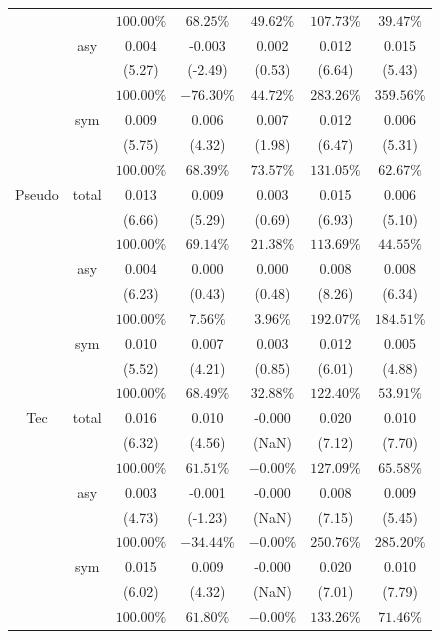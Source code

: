 \documentclass[
]{article}
\begin{document}
\begin{table}[H]
{\begin{tabular}{ccccccc}
   &  & $100.00\%$ & $68.25\%$ & $49.62\%$ & $107.73\%$ & $39.47\%$ \\ 
   & asy & 0.004 & -0.003 & 0.002 & 0.012 & 0.015 \\ 
   &  & (5.27) & (-2.49) & (0.53) & (6.64) & (5.43) \\ 
   &  & $100.00\%$ & $-76.30\%$ & $44.72\%$ & $283.26\%$ & $359.56\%$ \\ 
   & sym & 0.009 & 0.006 & 0.007 & 0.012 & 0.006 \\ 
   &  & (5.75) & (4.32) & (1.98) & (6.47) & (5.31) \\ 
   &  & $100.00\%$ & $68.39\%$ & $73.57\%$ & $131.05\%$ & $62.67\%$ \\ 
   \hline 
Pseudo & total & 0.013 & 0.009 & 0.003 & 0.015 & 0.006 \\ 
   &  & (6.66) & (5.29) & (0.69) & (6.93) & (5.10) \\ 
   &  & $100.00\%$ & $69.14\%$ & $21.38\%$ & $113.69\%$ & $44.55\%$ \\ 
   & asy & 0.004 & 0.000 & 0.000 & 0.008 & 0.008 \\ 
   &  & (6.23) & (0.43) & (0.48) & (8.26) & (6.34) \\ 
   &  & $100.00\%$ & $7.56\%$ & $3.96\%$ & $192.07\%$ & $184.51\%$ \\ 
   & sym & 0.010 & 0.007 & 0.003 & 0.012 & 0.005 \\ 
   &  & (5.52) & (4.21) & (0.85) & (6.01) & (4.88) \\ 
   &  & $100.00\%$ & $68.49\%$ & $32.88\%$ & $122.40\%$ & $53.91\%$ \\ 
   \hline 
Tec & total & 0.016 & 0.010 & -0.000 & 0.020 & 0.010 \\ 
   &  & (6.32) & (4.56) & (NaN) & (7.12) & (7.70) \\ 
   &  & $100.00\%$ & $61.51\%$ & $-0.00\%$ & $127.09\%$ & $65.58\%$ \\ 
   & asy & 0.003 & -0.001 & -0.000 & 0.008 & 0.009 \\ 
   &  & (4.73) & (-1.23) & (NaN) & (7.15) & (5.45) \\ 
   &  & $100.00\%$ & $-34.44\%$ & $-0.00\%$ & $250.76\%$ & $285.20\%$ \\ 
   & sym & 0.015 & 0.009 & -0.000 & 0.020 & 0.010 \\ 
   &  & (6.02) & (4.32) & (NaN) & (7.01) & (7.79) \\ 
   &  & $100.00\%$ & $61.80\%$ & $-0.00\%$ & $133.26\%$ & $71.46\%$ \\ 
   \hline 
\end{tabular}
}
\end{table}
\end{document}
